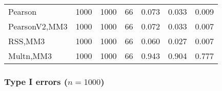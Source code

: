 \documentclass[
]{article}
\begin{document}
\begin{table}[H]
{\begin{tabular}[t]{lrrrrrr}
\hspace{1em}Pearson & 1000 & 1000 & 66 & 0.073 & 0.033 & 0.009\\
\hspace{1em}PearsonV2,MM3 & 1000 & 1000 & 66 & 0.072 & 0.033 & 0.007\\
\hspace{1em}RSS,MM3 & 1000 & 1000 & 66 & 0.060 & 0.027 & 0.007\\
\hspace{1em}Multn,MM3 & 1000 & 1000 & 66 & 0.943 & 0.904 & 0.777\\
\bottomrule
\end{tabular}}
\end{table}

\hypertarget{type-i-errors-n1000-1}{%
\subsubsection{\texorpdfstring{Type I errors
(\(n=1000\))}{Type I errors (n=1000)}}\label{type-i-errors-n1000-1}}
\end{document}
